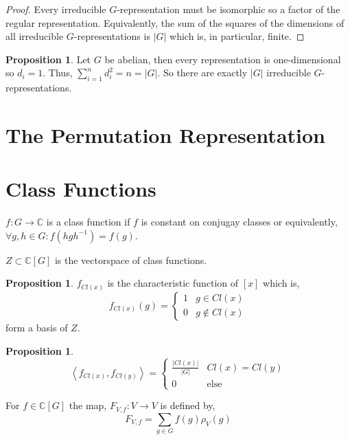 \documentclass[12pt]{extarticle}
\newcommand{\C}{\mathbb{C}}
\newcommand{\inner}[2]{\left<#1, #2 \right>}
\theoremstyle{definition}
\newtheorem{proposition}[theorem]{Proposition}
\newenvironment{definition}[1][Definition:]{\begin{trivlist}
\item[\hskip \labelsep {\bfseries #1}]}{\end{trivlist}}
\begin{document}
\begin{proof}
Every irreducible $G$-representation must be isomorphic so a factor of the regular representation. Equivalently, the sum of the squares of the dimensions of all irreducible $G$-representations is $|G|$ which is, in particular, finite. 
\end{proof}

\begin{proposition}
Let $G$ be abelian, then every representation is one-dimensional so $d_i = 1$. Thus, $\sum\limits_{i = 1}^n d_i^2 = n = |G|$. So there are exactly $|G|$ irreducible $G$-representations. 
\end{proposition}

\section{The Permutation Representation}


\section{Class Functions}

\begin{definition}
$f : G \to \C$ is a class function if $f$ is constant on conjugay classes or equivalently, $\forall g,h\in G : f(hgh^{-1}) = f(g)$.
\end{definition}

\begin{definition}
$Z \subset \C[G]$ is the vectorspace of class functions.
\end{definition}

\begin{proposition}
$f_{Cl(x)}$ is the characteristic function of $[x]$ which is,
\[
f_{Cl(x)}(g) = \begin{cases}
1 & g \in Cl(x) \\
0 & g \notin Cl(x)
\end{cases}\]
form a basis of $Z$.
\end{proposition}

\begin{proposition}
\[\inner{f_{Cl(x)}}{f_{Cl(y)}} = 
\begin{cases}
\frac{|Cl(x)|}{|G|} & Cl(x) = Cl(y) \\
0 & \text{else}
\end{cases}\]
\end{proposition}

\begin{definition}
For $f \in \C[G]$ the map,
$F_{V, f} : V \to V$ is defined by,
\[F_{V,f} = \sum_{g \in G} f(g) \rho_V(g)\]
\end{definition}
\end{document}
